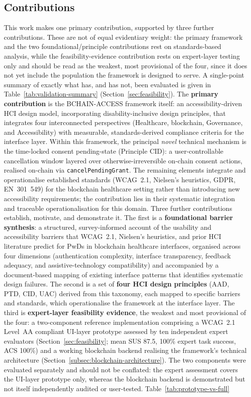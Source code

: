 \documentclass[journal,onecolumn]{IEEEtran}
\begin{document}
\subsection{Contributions}
This work makes one primary contribution, supported by three further contributions. These are not of equal evidentiary weight: the primary framework and the two foundational/principle contributions rest on standards-based analysis, while the feasibility-evidence contribution rests on expert-layer testing only and should be read as the weakest, most provisional of the four, since it does not yet include the population the framework is designed to serve. A single-point summary of exactly what has, and has not, been evaluated is given in Table~\ref{tab:validation-summary} (Section~\ref{sec:feasibility}).
The \textbf{primary contribution} is the BCHAIN-ACCESS framework itself: an accessibility-driven HCI design model, incorporating disability-inclusive design principles, that integrates four interconnected perspectives (Healthcare, blockchain, Governance, and Accessibility) with measurable, standards-derived compliance criteria for the interface layer. Within this framework, the principal \emph{novel} technical mechanism is the time-locked consent pending-state (Principle CID): a user-controllable cancellation window layered over otherwise-irreversible on-chain consent actions, realised on-chain via \texttt{cancelPendingGrant}. The remaining elements integrate and operationalise established standards (WCAG~2.1, Nielsen's heuristics, GDPR, EN~301~549) for the blockchain healthcare setting rather than introducing new accessibility requirements; the contribution lies in their systematic integration and traceable operationalisation for this domain. Three further contributions establish, motivate, and demonstrate it. The first is a \textbf{foundational barrier synthesis}: a structured, survey-informed account of the usability and accessibility barriers that WCAG~2.1, Nielsen's heuristics, and prior HCI literature predict for PwDs in blockchain healthcare interfaces, organised across four dimensions (authentication complexity, interface transparency, feedback adequacy, and assistive-technology compatibility) and accompanied by a document-based mapping of existing interface patterns that identifies systematic design failures. The second is a set of \textbf{four HCI design principles} (AAD, PTD, CID, UAC) derived from this taxonomy, each mapped to specific barriers and standards, which operationalise the framework at the interface layer. The third is \textbf{expert-layer feasibility evidence}, the weakest and most provisional of the four: a two-component reference implementation comprising a WCAG~2.1 Level~AA compliant UI-layer prototype assessed by ten independent expert evaluators (Section~\ref{sec:feasibility}; mean SUS 87.5, 100\% expert task success, ACS 100\%) and a working blockchain backend realising the framework's technical architecture (Section~\ref{subsec:blockchain-architecture}). The two components were evaluated separately and should not be conflated: the expert assessment covers the UI-layer prototype only, whereas the blockchain backend is demonstrated but not itself independently audited or user-tested. Table~\ref{tab:prototype-vs-full} 
\end{document}

